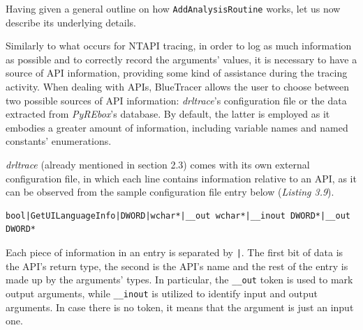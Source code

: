 Having given a general outline on how \texttt{AddAnalysisRoutine} works, let us now describe its underlying details.

Similarly to what occurs for NTAPI tracing, in order to log as much information as possible and to correctly record the arguments' values, it is necessary to have a source of API information, providing some kind of assistance during the tracing activity. When dealing with APIs, BlueTracer allows the user to choose between two possible sources of API information: \textit{drltrace}'s configuration file or the data extracted from \textit{PyREbox}'s database. By default, the latter is employed as it embodies a greater amount of information, including variable names and named constants' enumerations.

\textit{drltrace} (already mentioned in section 2.3) comes with its own external configuration file, in which each line contains information relative to an API, as it can be observed from the sample configuration file entry below (\textit{Listing 3.9}).      
\\
\begin{lstlisting}[caption={Sample entry in \textit{drltrace} configuration file},captionpos=b]
bool|GetUILanguageInfo|DWORD|wchar*|__out wchar*|__inout DWORD*|__out DWORD*
\end{lstlisting}

Each piece of information in an entry is separated by \texttt{|}. The first bit of data is the API's return type, the second is the API's name and the rest of the entry is made up by the arguments' types. In particular, the \texttt{\_\_out} token is used to mark output arguments, while \texttt{\_\_inout} is utilized to identify input and output arguments. In case there is no token, it means that the argument is just an input one. 

